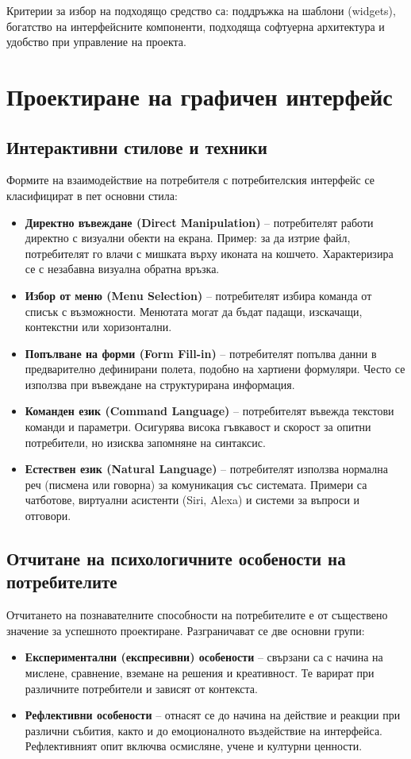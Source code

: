 \documentclass{scrartcl}
\begin{document}
\begin{FlushLeft}
Критерии за избор на подходящо средство са: поддръжка на шаблони (widgets), богатство на интерфейсните компоненти, подходяща софтуерна архитектура и удобство при управление на проекта.

\section{Проектиране на графичен интерфейс}

\subsection{Интерактивни стилове и техники}

Формите на взаимодействие на потребителя с потребителския интерфейс се класифицират в пет основни стила:
\begin{itemize}
    \item \textbf{Директно въвеждане (Direct Manipulation)} – потребителят работи директно с визуални обекти на екрана. Пример: за да изтрие файл, потребителят го влачи с мишката върху иконата на кошчето. Характеризира се с незабавна визуална обратна връзка.
    \item \textbf{Избор от меню (Menu Selection)} – потребителят избира команда от списък с възможности. Менютата могат да бъдат падащи, изскачащи, контекстни или хоризонтални.
    \item \textbf{Попълване на форми (Form Fill-in)} – потребителят попълва данни в предварително дефинирани полета, подобно на хартиени формуляри. Често се използва при въвеждане на структурирана информация.
    \item \textbf{Команден език (Command Language)} – потребителят въвежда текстови команди и параметри. Осигурява висока гъвкавост и скорост за опитни потребители, но изисква запомняне на синтаксис.
    \item \textbf{Естествен език (Natural Language)} – потребителят използва нормална реч (писмена или говорна) за комуникация със системата. Примери са чатботове, виртуални асистенти (Siri, Alexa) и системи за въпроси и отговори.
\end{itemize}

\subsection{Отчитане на психологичните особености на потребителите}

Отчитането на познавателните способности на потребителите е от съществено значение за успешното проектиране. Разграничават се две основни групи:
\begin{itemize}
    \item \textbf{Експериментални (експресивни) особености} – свързани са с начина на мислене, сравнение, вземане на решения и креативност. Те варират при различните потребители и зависят от контекста.
    \item \textbf{Рефлективни особености} – отнасят се до начина на действие и реакции при различни събития, както и до емоционалното въздействие на интерфейса. Рефлективният опит включва осмисляне, учене и културни ценности.
\end{itemize}


\end{FlushLeft}
\end{document}
